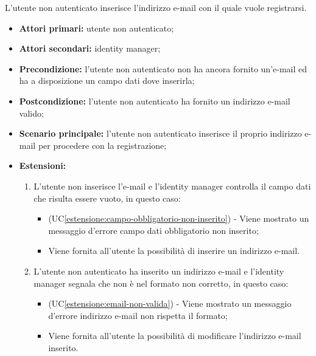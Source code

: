 \label{registrazione.modulo.email}

L'utente non autenticato inserisce l'indirizzo e-mail con il quale vuole registrarsi.
\begin{itemize}
	\item \textbf{Attori primari:} utente non autenticato;
	\item \textbf{Attori secondari:} identity manager;
	\item \textbf{Precondizione:} l'utente non autenticato non ha ancora fornito un'e-mail ed ha a disposizione un campo dati dove inserirla;
	\item \textbf{Postcondizione:} l'utente non autenticato ha fornito un indirizzo e-mail valido;
	\item \textbf{Scenario principale:} l'utente non autenticato inserisce il proprio indirizzo e-mail per procedere con la registrazione;
	\item \textbf{Estensioni:}
	\begin{enumerate}[label=\lett]
		\item L'utente non inserisce l'e-mail e l'identity manager controlla il campo dati che risulta essere vuoto, in questo caso:
		\begin{itemize}
			\item (UC\ref{estensione:campo-obbligatorio-non-inserito}) - Viene mostrato un messaggio d'errore campo dati obbligatorio non inserito;
			\item Viene fornita all'utente la possibilità di inserire un indirizzo e-mail.
		\end{itemize}
		\item L'utente non autenticato ha inserito un indirizzo e-mail e l'identity manager segnala che non è nel formato non corretto, in questo caso:
		\begin{itemize}
			\item (UC\ref{estensione:email-non-valida}) - Viene mostrato un messaggio d'errore indirizzo e-mail non rispetta il formato;
			\item Viene fornita all'utente la possibilità di modificare l'indirizzo e-mail inserito.
		\end{itemize}
	\end{enumerate}
\end{itemize}

\label{registrazione.modulo.password}

